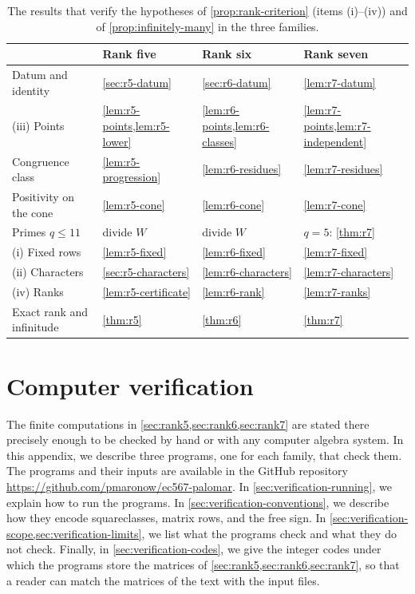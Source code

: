 \documentclass[12pt,oneside,openany]{book}
\theoremstyle{definition}
\theoremstyle{plain}
\numberwithin{equation}{chapter}
\theoremstyle{plain}
\theoremstyle{definition}
\theoremstyle{remark}
\begin{document}
\begin{table}[htbp]
\centering
\caption{The results that verify the hypotheses of \cref{prop:rank-criterion} (items (i)--(iv)) and of \cref{prop:infinitely-many} in the three families.}
\label{tab:proof-structure}
\small
\begin{tabular}{@{}llll@{}}
\toprule
 & Rank five & Rank six & Rank seven\\
\midrule
Datum and identity & \cref{sec:r5-datum} & \cref{sec:r6-datum} & \cref{lem:r7-datum}\\
(iii) Points & \cref{lem:r5-points,lem:r5-lower} & \cref{lem:r6-points,lem:r6-classes} & \cref{lem:r7-points,lem:r7-independent}\\
Congruence class & \cref{lem:r5-progression} & \cref{lem:r6-residues} & \cref{lem:r7-residues}\\
Positivity on the cone & \cref{lem:r5-cone} & \cref{lem:r6-cone} & \cref{lem:r7-cone}\\
Primes $q\le11$ & divide $W$ & divide $W$ & $q=5$: \cref{thm:r7}\\
(i) Fixed rows & \cref{lem:r5-fixed} & \cref{lem:r6-fixed} & \cref{lem:r7-fixed}\\
(ii) Characters & \cref{sec:r5-characters} & \cref{lem:r6-characters} & \cref{lem:r7-characters}\\
(iv) Ranks & \cref{lem:r5-certificate} & \cref{lem:r6-rank} & \cref{lem:r7-ranks}\\
\midrule
Exact rank and infinitude & \cref{thm:r5} & \cref{thm:r6} & \cref{thm:r7}\\
\bottomrule
\end{tabular}
\end{table}

\appendix
{}
\chapter{Computer verification}\label{app:verification}

The finite computations in \cref{sec:rank5,sec:rank6,sec:rank7} are stated there precisely enough to be checked by hand or with any computer algebra system. In this appendix, we describe three programs, one for each family, that check them. The programs and their inputs are available in the GitHub repository
\url{https://github.com/pmaronow/ec567-palomar}.
In \cref{sec:verification-running}, we explain how to run the programs. In \cref{sec:verification-conventions}, we describe how they encode squareclasses, matrix rows, and the free sign. In \cref{sec:verification-scope,sec:verification-limits}, we list what the programs check and what they do not check. Finally, in \cref{sec:verification-codes}, we give the integer codes under which the programs store the matrices of \cref{sec:rank5,sec:rank6,sec:rank7}, so that a reader can match the matrices of the text with the input files.
\end{document}
